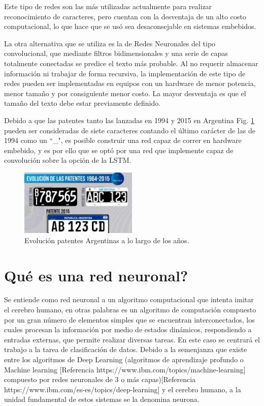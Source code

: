 Este tipo de redes son las más utilizadas actualmente para realizar reconocimiento de caracteres, pero cuentan con la desventaja de un alto costo computacional, lo que hace que se usó sea desaconsejable en sistemas embebidos.

La otra alternativa que se utiliza es la de Redes Neuronales del tipo convolucional, que mediante filtros bidimensionales y una serie de capas totalmente conectadas se predice el texto más probable.
Al no requerir almacenar información ni trabajar de forma recursiva, la implementación
de este tipo de redes pueden ser implementadas en equipos con un hardware de menor potencia, menor tamaño y por consiguiente menor costo. La mayor desventaja es que el tamaño del texto debe estar previamente definido.

Debido a que las patentes tanto las lanzadas en 1994 y 2015 en Argentina Fig. \ref{fig:patentes-arg} pueden ser consideradas de siete caracteres contando el último carácter de las de 1994 como un ``\_", es posible construir una red capaz de correr en hardware embebido, y es por ello que se optó por una red que implemente capaz de convolución sobre la opción de la LSTM.

\begin{figure}[h]
    \centering
    \includegraphics[width=0.5\textwidth]{imgs/patentes-arg.png}
    \caption{Evolución patentes Argentinas a lo largo de los años.}
    \label{fig:patentes-arg}
\end{figure}


\section{Qué es una red neuronal?}

Se entiende como red neuronal a un algoritmo computacional que intenta imitar el cerebro humano, en otras palabras es un algoritmo de computación compuesto por un gran número de elementos simples que se
encuentran interconectados, los cuales procesan la información por medio de estados dinámicos, respondiendo a entradas externas, que permite realizar diversas tareas.
En este caso se centrará el trabajo a la tarea de clasificación de datos.
Debido a la semenjanza que existe entre los algoritmos de Deep Learning (algoritmos de aprendizaje profundo o
Machine learning [Referencia https://www.ibm.com/topics/machine-learning] compuesto por redes neuronales
de 3 o más capas)[Referencia https://www.ibm.com/es-es/topics/deep-learning] y el cerebro humano, a la
unidad fundamental de estos sistemas se la denomina neurona.


